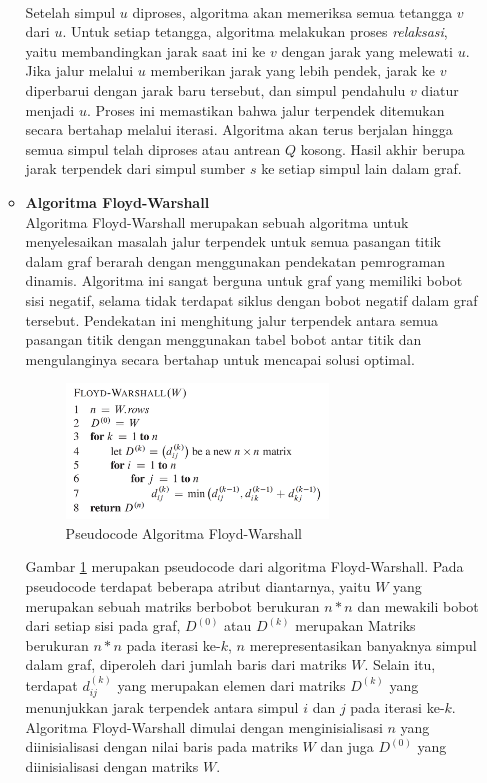 \documentclass[a4paper,twoside]{article}
\begin{document}
\begin{enumerate}
\begin{itemize}
            \\
            Setelah simpul $u$ diproses, algoritma akan memeriksa semua tetangga $v$ dari $u$. Untuk setiap tetangga, algoritma melakukan proses \textit{relaksasi}, yaitu membandingkan jarak saat ini ke $v$ dengan jarak yang melewati $u$. Jika jalur melalui $u$ memberikan jarak yang lebih pendek, jarak ke $v$ diperbarui dengan jarak baru tersebut, dan simpul pendahulu $v$ diatur menjadi $u$. Proses ini memastikan bahwa jalur terpendek ditemukan secara bertahap melalui iterasi. Algoritma akan terus berjalan hingga semua simpul telah diproses atau antrean $Q$ kosong. Hasil akhir berupa jarak terpendek dari simpul sumber $s$ ke setiap simpul lain dalam graf.

            \item \textbf{Algoritma Floyd-Warshall}
            \\ Algoritma Floyd-Warshall merupakan sebuah algoritma untuk menyelesaikan masalah jalur terpendek untuk semua pasangan titik dalam graf berarah dengan menggunakan pendekatan pemrograman dinamis. Algoritma ini sangat berguna untuk graf yang memiliki bobot sisi negatif, selama tidak terdapat siklus dengan bobot negatif dalam graf tersebut. Pendekatan ini menghitung jalur terpendek antara semua pasangan titik dengan menggunakan tabel bobot antar titik dan mengulanginya secara bertahap untuk mencapai solusi optimal.
            \begin{figure}[H] 
            	\centering  
            	\includegraphics[width=0.7\textwidth]{Gambar/fw.png}  
            	\caption{Pseudocode Algoritma Floyd-Warshall}
            	\label{fig:pseudocodefw} 
            \end{figure}
            \noindent
            Gambar \ref{fig:pseudocodefw} merupakan pseudocode dari algoritma Floyd-Warshall. Pada pseudocode terdapat beberapa atribut diantarnya, yaitu $W$ yang merupakan sebuah matriks berbobot berukuran $n*n$ dan mewakili bobot dari setiap sisi pada graf, $D^{(0)}$ atau $D^{(k)}$ merupakan Matriks berukuran $n*n$ pada iterasi ke-$k$, $n$ merepresentasikan banyaknya simpul dalam graf, diperoleh dari jumlah baris dari matriks $W$. Selain itu, terdapat $d_{ij}^{(k)}$ yang merupakan elemen dari matriks $D^{(k)}$ yang menunjukkan jarak terpendek antara simpul $i$ dan $j$ pada iterasi ke-$k$. Algoritma Floyd-Warshall dimulai dengan menginisialisasi $n$ yang diinisialisasi dengan nilai baris pada matriks $W$ dan juga $D^{(0)}$ yang diinisialisasi dengan matriks $W$. 

\end{itemize}
\end{enumerate}
\end{document}

